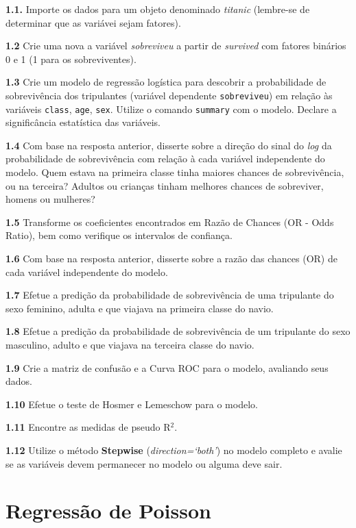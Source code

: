 \documentclass[12pt,brazil,oneside]{book}
\begin{document}
\textbf{1.1.} Importe os dados para um objeto denominado \emph{titanic}
(lembre-se de determinar que as variávei sejam fatores).

\textbf{1.2} Crie uma nova a variável \emph{sobreviveu} a partir de
\emph{survived} com fatores binários 0 e 1 (1 para os sobreviventes).

\textbf{1.3} Crie um modelo de regressão logística para descobrir a
probabilidade de sobrevivência dos tripulantes (variável dependente
\texttt{sobreviveu}) em relação às variáveis \texttt{class},
\texttt{age}, \texttt{sex}. Utilize o comando \texttt{summary} com o
modelo. Declare a significância estatística das variáveis.

\textbf{1.4} Com base na resposta anterior, disserte sobre a direção do
sinal do \emph{log} da probabilidade de sobrevivência com relação à cada
variável independente do modelo. Quem estava na primeira classe tinha
maiores chances de sobrevivência, ou na terceira? Adultos ou crianças
tinham melhores chances de sobreviver, homens ou mulheres?

\textbf{1.5} Transforme os coeficientes encontrados em Razão de Chances
(OR - Odds Ratio), bem como verifique os intervalos de confiança.

\textbf{1.6} Com base na resposta anterior, disserte sobre a razão das
chances (OR) de cada variável independente do modelo.

\textbf{1.7} Efetue a predição da probabilidade de sobrevivência de uma
tripulante do sexo feminino, adulta e que viajava na primeira classe do
navio.

\textbf{1.8} Efetue a predição da probabilidade de sobrevivência de um
tripulante do sexo masculino, adulto e que viajava na terceira classe do
navio.

\textbf{1.9} Crie a matriz de confusão e a Curva ROC para o modelo,
avaliando seus dados.

\textbf{1.10} Efetue o teste de Hosmer e Lemeschow para o modelo.

\textbf{1.11} Encontre as medidas de pseudo R\(^2\).

\textbf{1.12} Utilize o método \textbf{Stepwise}
(\emph{direction=`both'}) no modelo completo e avalie se as variáveis
devem permanecer no modelo ou alguma deve sair.

\hypertarget{regressao-de-poisson}{%
\chapter{Regressão de Poisson}\label{regressao-de-poisson}}
\end{document}
